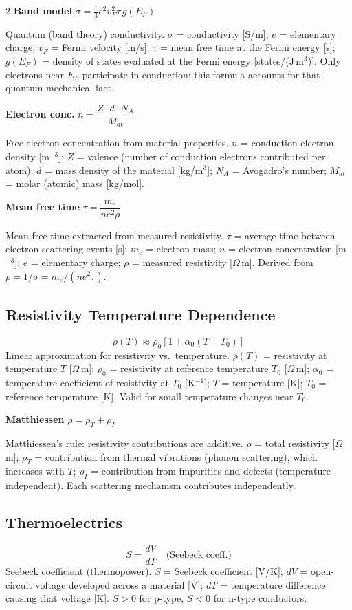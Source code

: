 \documentclass[9pt]{extarticle}
\newcommand{\eqlabel}[1]{\textbf{\scriptsize #1}\;}
\newcommand{\desc}[1]{{\small\color{desc}#1}}
\begin{document}
\begin{multicols}{2}
\eqlabel{Band model} $\sigma = \tfrac{1}{3}e^2v_F^2\tau\,g(E_F)$

\desc{Quantum (band theory) conductivity. $\sigma$ = conductivity [S/m]; $e$ = elementary charge; $v_F$ = Fermi velocity [m/s]; $\tau$ = mean free time at the Fermi energy [s]; $g(E_F)$ = density of states evaluated at the Fermi energy [states/(J\,m$^3$)]. Only electrons near $E_F$ participate in conduction; this formula accounts for that quantum mechanical fact.}

\eqlabel{Electron conc.} $n = \dfrac{Z\cdot d\cdot N_A}{M_{at}}$

\desc{Free electron concentration from material properties. $n$ = conduction electron density [m$^{-3}$]; $Z$ = valence (number of conduction electrons contributed per atom); $d$ = mass density of the material [kg/m$^3$]; $N_A$ = Avogadro's number; $M_{at}$ = molar (atomic) mass [kg/mol].}

\eqlabel{Mean free time} $\tau = \dfrac{m_e}{ne^2\rho}$

\desc{Mean free time extracted from measured resistivity. $\tau$ = average time between electron scattering events [s]; $m_e$ = electron mass; $n$ = electron concentration [m$^{-3}$]; $e$ = elementary charge; $\rho$ = measured resistivity [$\Omega$\,m]. Derived from $\rho = 1/\sigma = m_e/(ne^2\tau)$.}

\subsection{Resistivity Temperature Dependence}
\[\rho(T) \approx \rho_0[1 + \alpha_0(T - T_0)]\]
\desc{Linear approximation for resistivity vs.\ temperature. $\rho(T)$ = resistivity at temperature $T$ [$\Omega$\,m]; $\rho_0$ = resistivity at reference temperature $T_0$ [$\Omega$\,m]; $\alpha_0$ = temperature coefficient of resistivity at $T_0$ [K$^{-1}$]; $T$ = temperature [K]; $T_0$ = reference temperature [K]. Valid for small temperature changes near $T_0$.}

\eqlabel{Matthiessen} $\rho = \rho_T + \rho_I$

\desc{Matthiessen's rule: resistivity contributions are additive. $\rho$ = total resistivity [$\Omega$\,m]; $\rho_T$ = contribution from thermal vibrations (phonon scattering), which increases with $T$; $\rho_I$ = contribution from impurities and defects (temperature-independent). Each scattering mechanism contributes independently.}

\subsection{Thermoelectrics}
\[S = \frac{dV}{dT} \quad\text{(Seebeck coeff.)}\]
\desc{Seebeck coefficient (thermopower). $S$ = Seebeck coefficient [V/K]; $dV$ = open-circuit voltage developed across a material [V]; $dT$ = temperature difference causing that voltage [K]. $S > 0$ for p-type, $S < 0$ for n-type conductors.}


\end{multicols}
\end{document}
